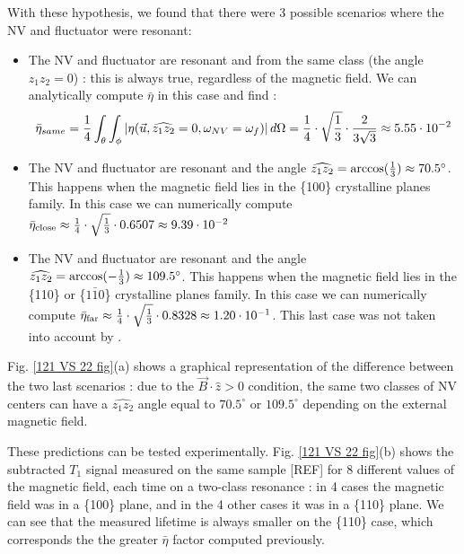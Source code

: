 \documentclass[preprintnumbers,amsmath,amssymb,onecolumn,12pt]{revtex4-2}
\begin{document}
With these hypothesis, we found that there were 3 possible scenarios where the NV and fluctuator were resonant:
\begin{itemize}
\item The NV and fluctuator are resonant and from the same class (the angle $\widehat{z_1 z_2}=0$) : this is always true, regardless of the magnetic field. We can analytically compute $\bar \eta$ in this case and find : $$ \bar {\eta}_{same}=\frac{1}{4}  \int_\theta \int_\phi \abs{\eta(\vec u,\widehat{z_1 z_2}=0,\omega_{NV}=\omega_f)}\, d\Omega= \frac{1}{4} \cdot \sqrt{\frac{1}{3}} \cdot \frac{2}{3 \sqrt{3}} \approx 5.55\cdot10^{-2}$$
\item The NV and fluctuator are resonant and the angle $\widehat{z_1 z_2}=\rm{arccos}(\frac{1}{3})\approx 70.5^\circ$. This happens when the magnetic field lies in the \{100\} crystalline planes family. In this case we can numerically compute $\bar \eta_{\rm close} \approx \frac{1}{4} \cdot \sqrt{\frac{1}{3}} \cdot 0.6507 \approx 9.39\cdot10^{-2}$
\item The NV and fluctuator are resonant and the angle $\widehat{z_1 z_2}=\rm{arccos}(-\frac{1}{3})\approx 109.5^\circ$. This happens when the magnetic field lies in the \{110\} or \{$1\bar{1}0$\} crystalline planes family. In this case we can numerically compute $\bar \eta_{\rm far} \approx \frac{1}{4} \cdot \sqrt{\frac{1}{3}} \cdot 0.8328 \approx 1.20\cdot10^{-1}$. This last case was not taken into account by \cite{choi_depolarization_2017}.
\end{itemize}



Fig. \ref{121 VS 22 fig}(a) shows a graphical representation of the difference between the two last scenarios : due to the $\vec{B}\cdot \hat{z} >0$ condition, the same two classes of NV centers can have a $\widehat{z_1 z_2}$ angle equal to $70.5^\circ$ or $109.5^\circ$ depending on the external magnetic field. 

These predictions can be tested experimentally. Fig. \ref{121 VS 22 fig}(b) shows the subtracted $T_1$ signal measured on the same sample [REF] for 8 different values of the magnetic field, each time on a two-class resonance : in 4 cases the magnetic field was in a \{100\} plane, and in the 4 other cases it was in a \{110\} plane. We can see that the measured lifetime is always smaller on the \{110\} case, which corresponds the the greater $\bar \eta$ factor computed previously.
\end{document}
